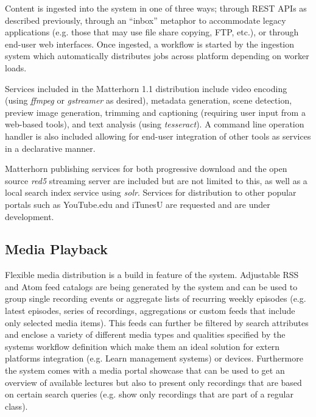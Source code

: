 \documentclass{sig-alternate}
\begin{document}
Content is ingested into the system in one of three ways; through REST APIs as described previously, through an ``inbox'' metaphor to accommodate legacy applications (e.g. those that may use file share copying, FTP, etc.), or through end-user web interfaces.  Once ingested, a workflow is started by the ingestion system which automatically distributes jobs across platform depending on worker loads.

Services included in the Matterhorn 1.1 distribution include video encoding (using \emph{ffmpeg} or \emph{gstreamer} as desired), metadata generation, scene detection, preview image generation, trimming and captioning (requiring user input from a web-based tools), and text analysis (using \emph{tesseract}).  A command line operation handler is also included allowing for end-user integration of other tools as services in a declarative manner.

Matterhorn publishing services for both progressive download and the open source \emph{red5} streaming server are included but are not limited to this, as well as a local search index service using \emph{solr}.  Services for distribution to other popular portals such as YouTube.edu and iTunesU are requested and are under development.

\subsection{Media Playback}
Flexible media distribution is a build in feature of the system. Adjustable RSS and Atom feed catalogs are being generated by the system and can be used to group single recording events or aggregate lists of recurring weekly episodes (e.g. latest episodes, series of recordings, aggregations or custom feeds that include only selected media items). This feeds can further be filtered by search attributes and enclose a variety of different media types and qualities specified by the systems workflow definition which make them an ideal solution for extern platforms integration (e.g. Learn management systems) or devices. Furthermore the system comes with a media portal showcase that can be used to get an overview of available lectures but also to present only recordings that are based on certain search queries (e.g. show only recordings that are part of a regular class).
\end{document}
